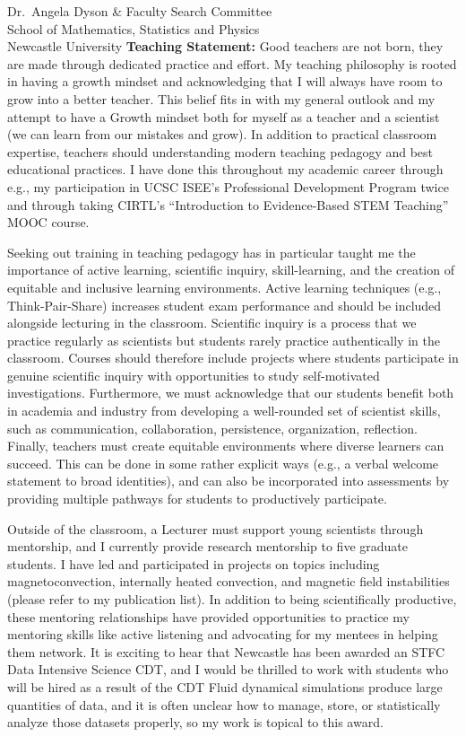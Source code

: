 \documentclass[12pt, a4paper]{letter}
\begin{document}
\begin{letter}{
        Dr.~Angela Dyson \& Faculty Search Committee \\
        School of Mathematics, Statistics and Physics \\
        Newcastle University}
    \textbf{Teaching Statement:} Good teachers are not born, they are made through dedicated practice and effort.
    My teaching philosophy is rooted in having a growth mindset and acknowledging that I will always have room to grow into a better teacher.
    This belief fits in with my general outlook and my attempt to have a Growth mindset both for myself as a teacher and a scientist (we can learn from our mistakes and grow).
    In addition to practical classroom expertise, teachers should understanding modern teaching pedagogy and best educational practices.
    I have done this throughout my academic career through e.g., my participation in UCSC ISEE's Professional Development Program twice and through taking CIRTL's ``Introduction to Evidence-Based STEM Teaching'' MOOC course.
    
    Seeking out training in teaching pedagogy has in particular taught me the importance of active learning, scientific inquiry, skill-learning, and the creation of equitable and inclusive learning environments.
    Active learning techniques (e.g., Think-Pair-Share) increases student exam performance and should be included alongside lecturing in the classroom.
    Scientific inquiry is a process that we practice regularly as scientists but students rarely practice authentically in the classroom.
    Courses should therefore include projects where students participate in genuine scientific inquiry with opportunities to study self-motivated investigations.
    Furthermore, we must acknowledge that our students benefit both in academia and industry from developing a well-rounded set of scientist skills, such as communication, collaboration, persistence, organization, reflection.
    Finally, teachers must create equitable environments where diverse learners can succeed.
    This can be done in some rather explicit ways (e.g., a verbal welcome statement to broad identities), and can also be incorporated into assessments by providing multiple pathways for students to productively participate.

    Outside of the classroom, a Lecturer must support young scientists through mentorship, and I currently provide research mentorship to five graduate students.
    I have led and participated in projects on topics including  magnetoconvection, internally heated convection, and magnetic field instabilities (please refer to my publication list).
    In addition to being scientifically productive, these mentoring relationships have provided opportunities to practice my mentoring skills like active listening and advocating for my mentees in helping them network.
    It is exciting to hear that Newcastle has been awarded an STFC Data Intensive Science CDT, and I would be thrilled to work with students who will be hired as a result of the CDT 
    Fluid dynamical simulations produce large quantities of data, and it is often unclear how to manage, store, or statistically analyze those datasets properly, so my work is topical to this award.


\end{letter}
\end{document}
